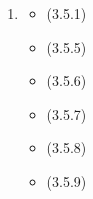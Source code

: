 \documentclass{article}
\begin{document}
\begin{enumerate}
	\item

	      \begin{itemize}
		      \item (3.5.1)
		      \item (3.5.5)

		      \item (3.5.6)
		      \item (3.5.7)
		      \item (3.5.8)
		      \item (3.5.9)
	      \end{itemize}
\end{enumerate}
\end{document}
